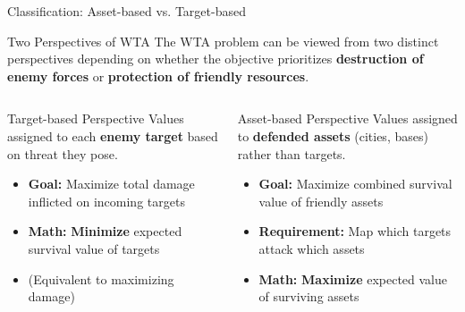 \documentclass[aspectratio=43,8pt]{beamer}
\begin{document}
\begin{frame}{Classification: Asset-based vs. Target-based}
\begin{block}{Two Perspectives of WTA}
The WTA problem can be viewed from two distinct perspectives depending on whether the objective prioritizes \textbf{destruction of enemy forces} or \textbf{protection of friendly resources}.
\end{block}

\vspace{0.3cm}
\begin{columns}[t]
\begin{alertblock}{Target-based Perspective}
Values assigned to each \textbf{enemy target} based on threat they pose.
\begin{itemize}
    \item \textbf{Goal:} Maximize total damage inflicted on incoming targets
    \item \textbf{Math:} \textbf{Minimize} expected survival value of targets
    \item (Equivalent to maximizing damage)
\end{itemize}
\end{alertblock}

\begin{exampleblock}{Asset-based Perspective}
Values assigned to \textbf{defended assets} (cities, bases) rather than targets.
\begin{itemize}
    \item \textbf{Goal:} Maximize combined survival value of friendly assets
    \item \textbf{Requirement:} Map which targets attack which assets
    \item \textbf{Math:} \textbf{Maximize} expected value of surviving assets
\end{itemize}
\end{exampleblock}
\end{columns}
\end{frame}
\end{document}
